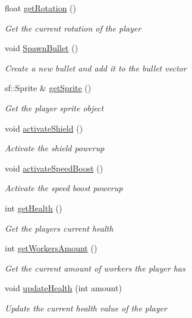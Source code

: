 \begin{DoxyCompactItemize}
float \mbox{\hyperlink{class_player_aa2890f51b31e33f439f6bd67092168f7}{get\+Rotation}} ()
\begin{DoxyCompactList}\small\item\em Get the current rotation of the player \end{DoxyCompactList}\item 
void \mbox{\hyperlink{class_player_a00aa77d7a95a64308cd5e1967b6aa5db}{Spawn\+Bullet}} ()
\begin{DoxyCompactList}\small\item\em Create a new bullet and add it to the bullet vector \end{DoxyCompactList}\item 
sf\+::\+Sprite \& \mbox{\hyperlink{class_player_a408134399497e07b0ba53e82d5c40958}{get\+Sprite}} ()
\begin{DoxyCompactList}\small\item\em Get the player sprite object \end{DoxyCompactList}\item 
void \mbox{\hyperlink{class_player_ad163355044810f54a774431682a1e0ea}{activate\+Shield}} ()
\begin{DoxyCompactList}\small\item\em Activate the shield powerup \end{DoxyCompactList}\item 
void \mbox{\hyperlink{class_player_a5f4304a0c7f0a12489a466d6ab44347d}{activate\+Speed\+Boost}} ()
\begin{DoxyCompactList}\small\item\em Activate the speed boost powerup \end{DoxyCompactList}\item 
int \mbox{\hyperlink{class_player_abcb15d249bed9a4ab0ab86b52b0d747a}{get\+Health}} ()
\begin{DoxyCompactList}\small\item\em Get the players current health \end{DoxyCompactList}\item 
int \mbox{\hyperlink{class_player_a8ac0829fa3a82b6aa8ce61d40891afed}{get\+Workers\+Amount}} ()
\begin{DoxyCompactList}\small\item\em Get the current amount of workers the player has \end{DoxyCompactList}\item 
void \mbox{\hyperlink{class_player_a080378b41ec0a6b25496cf1664a9a676}{update\+Health}} (int amount)
\begin{DoxyCompactList}\small\item\em Update the current health value of the player \end{DoxyCompactList}\item 

\end{DoxyCompactItemize}
